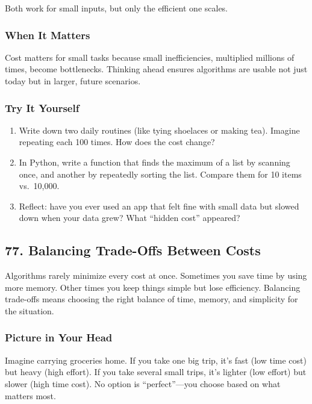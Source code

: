 \documentclass[
  letterpaper,
  DIV=11,
  numbers=noendperiod]{scrreprt}
\providecommand{\tightlist}{%
  \setlength{\itemsep}{0pt}\setlength{\parskip}{0pt}}
\begin{document}
Both work for small inputs, but only the efficient one scales.

\subsubsection{When It Matters}\label{when-it-matters-74}

Cost matters for small tasks because small inefficiencies, multiplied
millions of times, become bottlenecks. Thinking ahead ensures algorithms
are usable not just today but in larger, future scenarios.

\subsubsection{Try It Yourself}\label{try-it-yourself-76}

\begin{enumerate}
\def\labelenumi{\arabic{enumi}.}
\tightlist
\item
  Write down two daily routines (like tying shoelaces or making tea).
  Imagine repeating each 100 times. How does the cost change?
\item
  In Python, write a function that finds the maximum of a list by
  scanning once, and another by repeatedly sorting the list. Compare
  them for 10 items vs.~10,000.
\item
  Reflect: have you ever used an app that felt fine with small data but
  slowed down when your data grew? What ``hidden cost'' appeared?
\end{enumerate}

\subsection{77. Balancing Trade-Offs Between
Costs}\label{balancing-trade-offs-between-costs}

Algorithms rarely minimize every cost at once. Sometimes you save time
by using more memory. Other times you keep things simple but lose
efficiency. Balancing trade-offs means choosing the right balance of
time, memory, and simplicity for the situation.

\subsubsection{Picture in Your Head}\label{picture-in-your-head-77}

Imagine carrying groceries home. If you take one big trip, it's fast
(low time cost) but heavy (high effort). If you take several small
trips, it's lighter (low effort) but slower (high time cost). No option
is ``perfect''---you choose based on what matters most.
\end{document}
